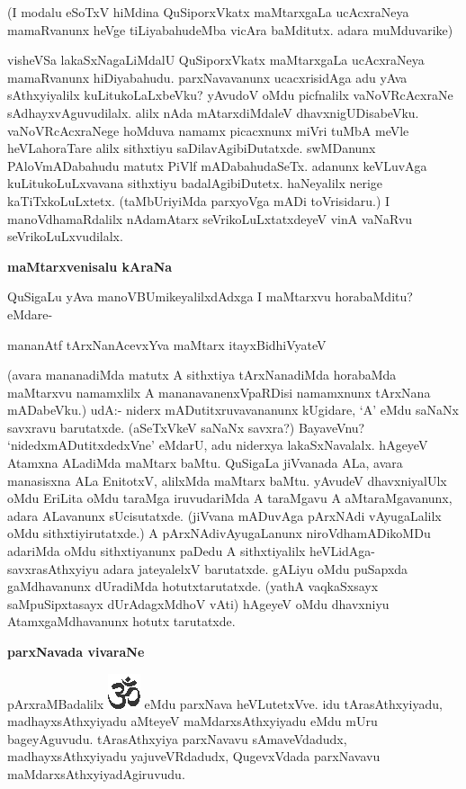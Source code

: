 \noindent
  (I modalu eSoTxV hiMdina QuSiporxVkatx maMtarxgaLa ucAcxraNeya mamaRvanunx heVge tiLiyabahudeMba vicAra baMditutx. adara muMduvarike) 
  
visheVSa lakaSxNagaLiMdalU QuSiporxVkatx maMtarxgaLa ucAcxraNeya mamaRvanunx hiDiyabahudu. parxNavavanunx ucacxrisidAga adu yAva sAthxyiyalilx kuLitukoLaLxbeVku? yAvudoV oMdu picfnalilx vaNoVRcAcxraNe sAdhayxvAguvudilalx. alilx nAda mAtarxdiMdaleV dhavxnigUDisabeVku. vaNoVRcAcxraNege hoMduva namamx picacxnunx miVri tuMbA meVle heVLahoraTare alilx sithxtiyu saDilavAgibiDutatxde. swMDanunx PAloVmADabahudu matutx PiVlf mADabahudaSeTx. adanunx keVLuvAga kuLitukoLuLxvavana sithxtiyu badalAgibiDutetx. haNeyalilx nerige kaTiTxkoLuLxtetx. (taMbUriyiMda parxyoVga mADi toVrisidaru.) I manoVdhamaRdalilx nAdamAtarx seVrikoLuLxtatxdeyeV vinA vaNaRvu seVrikoLuLxvudilalx.
  
 {\bigskip
\noindent
{\large\bf maMtarxvenisalu kAraNa}}\label{page120b}
\medskip

\noindent 
QuSigaLu yAva manoVBUmikeyalilxdAdxga I maMtarxvu horabaMditu? eMdare-
 
 \begin{shloka}
mananAtf tArxNanAcevxYva maMtarx itayxBidhiVyateV\label{121}
 \end{shloka}

\noindent
(avara mananadiMda matutx A sithxtiya tArxNanadiMda horabaMda maMtarxvu namamxlilx A mananavanenxVpaRDisi namamxnunx tArxNana mADabeVku.) udA:- niderx mADutitxruvavananunx kUgidare, `A' eMdu saNaNx savxravu barutatxde. (aSeTxVkeV saNaNx savxra?) BayaveVnu? `nidedxmADutitxdedxVne' eMdarU, adu niderxya lakaSxNavalalx. hAgeyeV Atamxna ALadiMda maMtarx baMtu. QuSigaLa jiVvanada ALa, avara manasisxna ALa EnitotxV, alilxMda maMtarx baMtu. yAvudeV dhavxniyalUlx oMdu EriLita oMdu taraMga iruvudariMda A taraMgavu A aMtaraMgavanunx, adara ALavanunx sUcisutatxde. (jiVvana mADuvAga pArxNAdi vAyugaLalilx oMdu sithxtiyirutatxde.) A pArxNAdivAyugaLanunx niroVdhamADikoMDu adariMda oMdu sithxtiyanunx paDedu A sithxtiyalilx heVLidAga-savxrasAthxyiyu adara jateyalelxV barutatxde. gALiyu oMdu puSapxda gaMdhavanunx dUradiMda hotutxtarutatxde. (yathA vaqkaSxsayx\label{121a} saMpuSipxtasayx dUrAdagxMdhoV vAti) hAgeyeV oMdu dhavxniyu AtamxgaMdhavanunx hotutx tarutatxde.

{\bigskip
\noindent
{\large\bf parxNavada vivaraNe}}\label{page121a}
\medskip

\noindent
pArxraMBadalilx {\includegraphics[scale=.6]{om.eps}} eMdu parxNava heVLutetxVve. idu tArasAthxyiyadu, madhayxsAthxyiyadu aMteyeV maMdarxsAthxyiyadu eMdu mUru bageyAguvudu. tArasAthxyiya parxNavavu sAmaveVdadudx, madhayxsAthxyiyadu yajuveVRdadudx, QugevxVdada parxNavavu maMdarxsAthxyiyadAgiruvudu.

